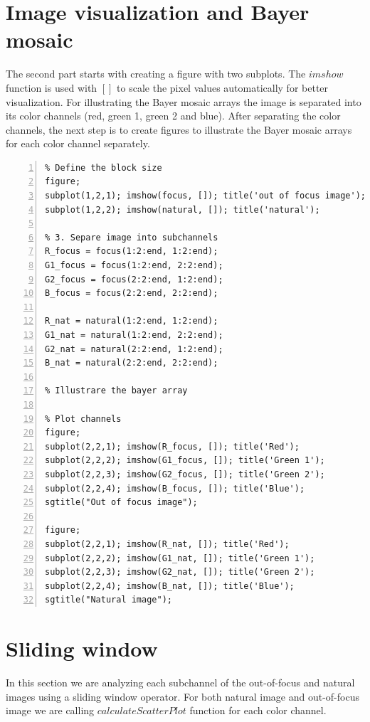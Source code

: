 \documentclass[12pt,a4paper,english
]{tunithesis}
\begin{document}
\section{Image visualization and Bayer mosaic}
The second part starts with creating a figure with two subplots. The $imshow$ function is used with $[]$ to scale the pixel values automatically for better visualization. For illustrating the Bayer mosaic arrays the image is separated into its color channels (red, green 1, green 2 and blue). After separating the color channels, the next step is to create figures to illustrate the Bayer mosaic arrays for each color channel separately.
\begin{lstlisting}[style=Matlab-editor, numbers=left, basicstyle=\small]
% 2. Visualize Images, Bayer mosaic array
% Define the block size
figure;
subplot(1,2,1); imshow(focus, []); title('out of focus image');
subplot(1,2,2); imshow(natural, []); title('natural');

% 3. Separe image into subchannels
R_focus = focus(1:2:end, 1:2:end);
G1_focus = focus(1:2:end, 2:2:end);
G2_focus = focus(2:2:end, 1:2:end);
B_focus = focus(2:2:end, 2:2:end);

R_nat = natural(1:2:end, 1:2:end);
G1_nat = natural(1:2:end, 2:2:end);
G2_nat = natural(2:2:end, 1:2:end);
B_nat = natural(2:2:end, 2:2:end);

% Illustrare the bayer array

% Plot channels
figure;
subplot(2,2,1); imshow(R_focus, []); title('Red');
subplot(2,2,2); imshow(G1_focus, []); title('Green 1');
subplot(2,2,3); imshow(G2_focus, []); title('Green 2');
subplot(2,2,4); imshow(B_focus, []); title('Blue');
sgtitle("Out of focus image");

figure;
subplot(2,2,1); imshow(R_nat, []); title('Red');
subplot(2,2,2); imshow(G1_nat, []); title('Green 1');
subplot(2,2,3); imshow(G2_nat, []); title('Green 2');
subplot(2,2,4); imshow(B_nat, []); title('Blue');
sgtitle("Natural image");
\end{lstlisting}
\section{Sliding window}
In this section we are analyzing each subchannel of the out-of-focus and natural images using a sliding window operator. For both natural image and out-of-focus image we are calling $calculateScatterPlot$ function for each color channel.
\end{document}
